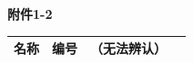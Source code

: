 \documentclass[UTF8,10pt,a4paper,fontset=fandol]{ctexart}
\newcommand{\fieldvalue}[1]{#1}
\newcommand{\handwritten}[1]{#1}
\begin{document}
\vspace{0.5em}

\handwritten{}


\newpage

\begin{center}
\textbf{附件1-2}\\
\end{center}

\begin{tabularx}{\textwidth}{|l|X|l|X|}
\hline
名称 & %
编号 &
\fieldvalue{\handwritten{（无法辨认）}} &
\\
\hline
\end{tabularx}

\vspace{0.5em}
\end{document}
